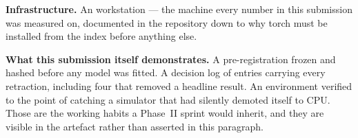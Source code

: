 \textbf{Infrastructure.} An  workstation
--- the machine every number in this submission was measured on, documented in the repository
down to why torch must be installed from the  index before anything else.

\textbf{What this submission itself demonstrates.} A pre-registration frozen and hashed before
any model was fitted. A decision log of \ClaimDecisionEntries{} entries carrying every
retraction, including four that removed a headline result. An environment verified to the
point of catching a simulator that had silently demoted itself to CPU. Those are the working
habits a Phase~II sprint would inherit, and they are visible in the artefact rather than
asserted in this paragraph.
